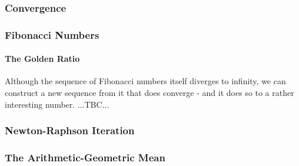 


\subsubsection{Convergence}

\subsubsection{Fibonacci Numbers}



\paragraph{The Golden Ratio}
Although the sequence of Fibonacci numbers itself diverges to infinity, we can construct a new sequence from it that does converge - and it does so to a rather interesting number. ...TBC...


\subsubsection{Newton-Raphson Iteration}



\subsubsection{The Arithmetic-Geometric Mean}


